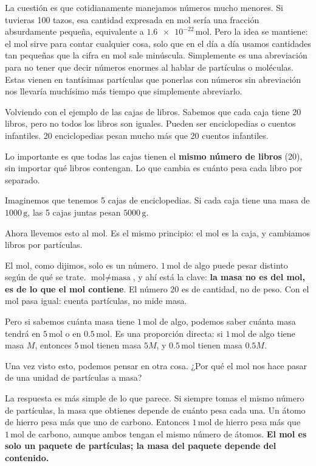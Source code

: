 La cuestión es que cotidianamente manejamos números mucho menores. Si tuvieras 
100 tazos, esa cantidad expresada en mol sería una fracción absurdamente 
pequeña, equivalente a $\num{1.6e-22}\,\mathrm{mol}$. Pero la idea se mantiene: el mol 
sirve para contar cualquier cosa, solo que en el día a día usamos cantidades 
tan pequeñas que la cifra en mol sale minúscula. Simplemente es una abreviación 
para no tener que decir números enormes al hablar de partículas o moléculas. 
Estas vienen en tantísimas partículas que ponerlas con números sin abreviación 
nos llevaría muchísimo más tiempo que simplemente abreviarlo.

\medskip
Volviendo con el ejemplo de las cajas de libros. Sabemos que cada caja tiene 
20 libros, pero no todos los libros son iguales. Pueden ser enciclopedias o 
cuentos infantiles. 20 enciclopedias pesan mucho más que 20 cuentos infantiles.

Lo importante es que todas las cajas tienen el \textbf{mismo número de libros} 
(20), sin importar qué libros contengan. Lo que cambia es cuánto pesa cada 
libro por separado.

Imaginemos que tenemos 5 cajas de enciclopedias. Si cada caja tiene una masa 
de $1000\,\mathrm{g}$, las 5 cajas juntas pesan $5000\,\mathrm{g}$.

\medskip
Ahora llevemos esto al mol. Es el mismo principio: el mol es la caja, y 
cambiamos libros por partículas.

El mol, como dijimos, solo es un número. $1\,\mathrm{mol}$ de algo puede pesar 
distinto según de qué se trate. $\text{mol} \neq \text{masa}$, y ahí está la 
clave: \textbf{la masa no es del mol, es de lo que el mol contiene}. El número 
20 es de cantidad, no de peso. Con el mol pasa igual: cuenta partículas, no 
mide masa.

Pero si sabemos cuánta masa tiene $1\,\mathrm{mol}$ de algo, podemos saber 
cuánta masa tendrá en $5\,\mathrm{mol}$ o en $0.5\,\mathrm{mol}$. Es una 
proporción directa: si $1\,\mathrm{mol}$ de algo tiene masa $M$, entonces 
$5\,\mathrm{mol}$ tienen masa $5M$, y $0.5\,\mathrm{mol}$ tienen masa $0.5M$.

\medskip
Una vez visto esto, podemos pensar en otra cosa. ¿Por qué el mol nos hace 
pasar de una unidad de partículas a masa?

La respuesta es más simple de lo que parece. Si siempre tomas el mismo número 
de partículas, la masa que obtienes depende de cuánto pesa cada una. Un átomo 
de hierro pesa más que uno de carbono. Entonces $1\,\mathrm{mol}$ de hierro 
pesa más que $1\,\mathrm{mol}$ de carbono, aunque ambos tengan el mismo número 
de átomos. \textbf{El mol es solo un paquete de partículas; la masa del paquete 
depende del contenido.}

